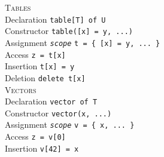 \documentclass[10pt,landscape]{article}
\newcommand{\minisec}[1]{\textsc{#1}\\}
\begin{document}
\begin{multicols*}{3}
\minisec{Tables}
Declaration \dotfill \verb|table[T] of U|\\
Constructor \dotfill \verb|table([x] = y, ...)|\\
Assignment \dotfill \texttt{\textit{scope}} \verb|t = { [x] = y, ... }|\\
Access \dotfill \verb|z = t[x]|\\
Insertion \dotfill \verb|t[x] = y|\\
Deletion \dotfill \verb|delete t[x]|\\

\minisec{Vectors}
Declaration \dotfill \verb|vector of T|\\
Constructor \dotfill \verb|vector(x, ...)|\\
Assignment \dotfill \texttt{\textit{scope}} \verb|v = { x, ... }|\\
Access \dotfill \verb|z = v[0]|\\
Insertion \dotfill \verb|v[42] = x|
\end{multicols*}
\end{document}
